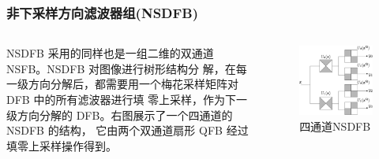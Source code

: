 \documentclass[10pt,aspectratio=43,mathserif]{beamer}
\begin{document}
\begin{frame}
		  \frametitle{\textbf{非下采样方向滤波器组(NSDFB)}}
            \begin{columns}
                \footnotesize
                NSDFB 采用的同样也是一组二维的双通道 NSFB。NSDFB 对图像进行树形结构分
解，在每一级方向分解后，都需要用一个梅花采样矩阵对 DFB 中的所有滤波器进行填
零上采样，作为下一级方向分解的 DFB。右图展示了一个四通道的 NSDFB 的结构，
它由两个双通道扇形 QFB 经过填零上采样操作得到。

                \begin{figure}[!t]
                    \centering
                    \includegraphics[width=1.1\textwidth]{./figures/nsct/NSDFB.png}
                    \caption{四通道NSDFB}
                \end{figure}
        \end{columns}
    \end{frame}
\end{document}
